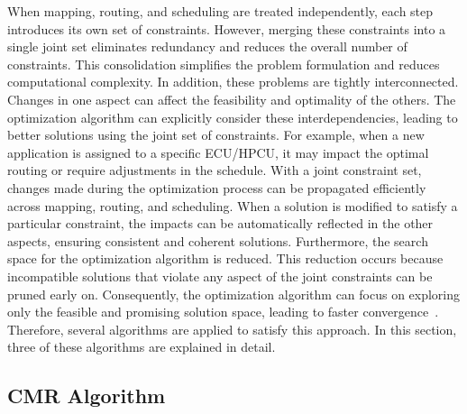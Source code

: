      When mapping, routing, and scheduling are treated independently, each step introduces its own set of constraints. However, merging these constraints into a single joint set eliminates redundancy and reduces the overall number of constraints. This consolidation simplifies the problem formulation and reduces computational complexity. In addition, these problems are tightly interconnected. Changes in one aspect can affect the feasibility and optimality of the others. The optimization algorithm can explicitly consider these interdependencies, leading to better solutions using the joint set of constraints. For example, when a new application is assigned to a specific ECU/HPCU, it may impact the optimal routing or require adjustments in the schedule. With a joint constraint set, changes made during the optimization process can be propagated efficiently across mapping, routing, and scheduling. When a solution is modified to satisfy a particular constraint, the impacts can be automatically reflected in the other aspects, ensuring consistent and coherent solutions. Furthermore, the search space for the optimization algorithm is reduced. This reduction occurs because incompatible solutions that violate any aspect of the joint constraints can be pruned early on. Consequently, the optimization algorithm can focus on exploring only the feasible and promising solution space, leading to faster convergence~\cite{9613692, 9565115, smirnov2017optimizing, askaripoor2023designer}. Therefore,
    several algorithms are applied to satisfy this approach. In this section, three of these algorithms are explained in detail. 
    
    
    

    \subsection{CMR Algorithm}
    
